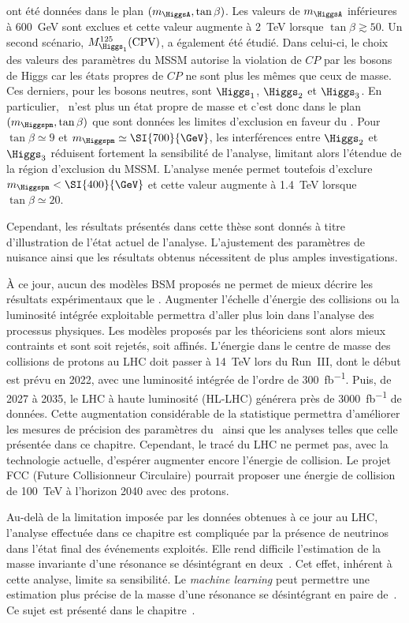 ont été données
dans le plan
$(m_{\HiggsA},\tan\beta)$.
Les valeurs de $m_{\HiggsA}$ inférieures à \SI{600}{\GeV} sont exclues
et cette valeur augmente à \SI{2}{\TeV} lorsque $\tan\beta\gtrsim\num{50}$.
Un second scénario, $M_{\Higgs_1}^{125}(\text{CPV})$,
a également été étudié.
Dans celui-ci, le choix des valeurs des paramètres du MSSM
autorise la violation de $CP$ par les bosons de Higgs
car les états propres de $CP$ ne sont plus les mêmes que ceux de masse.
Ces derniers, pour les bosons neutres, sont
$\Higgs_1$, $\Higgs_2$ et $\Higgs_3$.
En particulier, \HiggsA\ n'est plus un état propre de masse et c'est donc
dans le plan $(m_{\Higgspm},\tan\beta)$ que sont données les limites d'exclusion en faveur du \SM.
Pour $\tan\beta\simeq\num{9}$ et $m_{\Higgspm}\simeq\SI{700}{\GeV}$,
les interférences entre $\Higgs_2$ et $\Higgs_3$ réduisent fortement la sensibilité de l'analyse,
limitant alors l'étendue de la région d'exclusion du MSSM.
L'analyse menée permet toutefois d'exclure $m_{\Higgspm} < \SI{400}{\GeV}$
et cette valeur augmente à \SI{1.4}{\TeV} lorsque $\tan\beta\simeq\num{20}$.
\par
Cependant,
les résultats présentés dans cette thèse sont donnés à titre d'illustration de l'état actuel de l'analyse.
L'ajustement des paramètres de nuisance ainsi que les résultats obtenus nécessitent de plus amples investigations.
\par
À ce jour,
aucun des modèles BSM proposés ne permet de mieux décrire les résultats expérimentaux que le \SM.
Augmenter l'échelle d'énergie des collisions ou la luminosité intégrée exploitable permettra d'aller plus loin dans l'analyse des processus physiques.
Les modèles proposés par les théoriciens sont alors mieux contraints et sont soit rejetés, soit affinés.
L'énergie dans le centre de masse des collisions de protons au LHC doit passer à \SI{14}{\TeV} lors du Run~III, dont le début est prévu en 2022, avec une luminosité intégrée de l'ordre de \SI{300}{\femto\barn^{-1}}.
Puis, de 2027 à 2035, le LHC à haute luminosité (HL-LHC) générera près de \SI{3000}{\femto\barn^{-1}} de données.
Cette augmentation considérable de la statistique
permettra d'améliorer les mesures de précision des paramètres du \SM\
ainsi que les analyses telles que celle présentée dans ce chapitre.
Cependant, le tracé du LHC ne permet pas, avec la technologie actuelle, d'espérer augmenter encore l'énergie de collision.
Le projet FCC (Future Collisionneur Circulaire) \cite{FCC} pourrait proposer une énergie de collision de \SI{100}{\TeV} à l'horizon 2040 avec des protons.
\par
Au-delà de la limitation imposée par les données obtenues à ce jour au LHC,
l'analyse effectuée dans ce chapitre est compliquée par la présence de neutrinos dans l'état final des événements exploités.
Elle
rend difficile l'estimation de la masse invariante d'une résonance se désintégrant en deux~\tau.
Cet effet, inhérent à cette analyse, limite sa sensibilité.
Le \emph{machine learning} peut permettre une estimation plus précise de la masse d'une résonance se désintégrant en paire de~\tau.
Ce sujet est présenté dans le chapitre~\refChML.